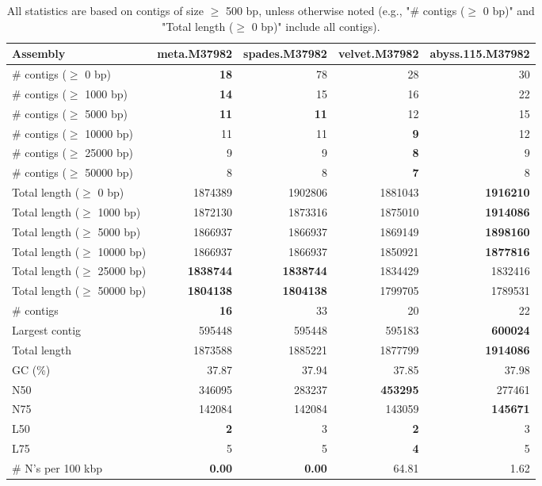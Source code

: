\documentclass[12pt,a4paper]{article}
\begin{document}
\begin{table}[ht]
\begin{center}
\caption{All statistics are based on contigs of size $\geq$ 500 bp, unless otherwise noted (e.g., "\# contigs ($\geq$ 0 bp)" and "Total length ($\geq$ 0 bp)" include all contigs).}
\begin{tabular}{|l*{4}{|r}|}
\hline
Assembly & meta.M37982 & spades.M37982 & velvet.M37982 & abyss.115.M37982 \\ \hline
\# contigs ($\geq$ 0 bp) & {\bf 18} & 78 & 28 & 30 \\ \hline
\# contigs ($\geq$ 1000 bp) & {\bf 14} & 15 & 16 & 22 \\ \hline
\# contigs ($\geq$ 5000 bp) & {\bf 11} & {\bf 11} & 12 & 15 \\ \hline
\# contigs ($\geq$ 10000 bp) & 11 & 11 & {\bf 9} & 12 \\ \hline
\# contigs ($\geq$ 25000 bp) & 9 & 9 & {\bf 8} & 9 \\ \hline
\# contigs ($\geq$ 50000 bp) & 8 & 8 & {\bf 7} & 8 \\ \hline
Total length ($\geq$ 0 bp) & 1874389 & 1902806 & 1881043 & {\bf 1916210} \\ \hline
Total length ($\geq$ 1000 bp) & 1872130 & 1873316 & 1875010 & {\bf 1914086} \\ \hline
Total length ($\geq$ 5000 bp) & 1866937 & 1866937 & 1869149 & {\bf 1898160} \\ \hline
Total length ($\geq$ 10000 bp) & 1866937 & 1866937 & 1850921 & {\bf 1877816} \\ \hline
Total length ($\geq$ 25000 bp) & {\bf 1838744} & {\bf 1838744} & 1834429 & 1832416 \\ \hline
Total length ($\geq$ 50000 bp) & {\bf 1804138} & {\bf 1804138} & 1799705 & 1789531 \\ \hline
\# contigs & {\bf 16} & 33 & 20 & 22 \\ \hline
Largest contig & 595448 & 595448 & 595183 & {\bf 600024} \\ \hline
Total length & 1873588 & 1885221 & 1877799 & {\bf 1914086} \\ \hline
GC (\%) & 37.87 & 37.94 & 37.85 & 37.98 \\ \hline
N50 & 346095 & 283237 & {\bf 453295} & 277461 \\ \hline
N75 & 142084 & 142084 & 143059 & {\bf 145671} \\ \hline
L50 & {\bf 2} & 3 & {\bf 2} & 3 \\ \hline
L75 & 5 & 5 & {\bf 4} & 5 \\ \hline
\# N's per 100 kbp & {\bf 0.00} & {\bf 0.00} & 64.81 & 1.62 \\ \hline
\end{tabular}
\end{center}
\end{table}
\end{document}
